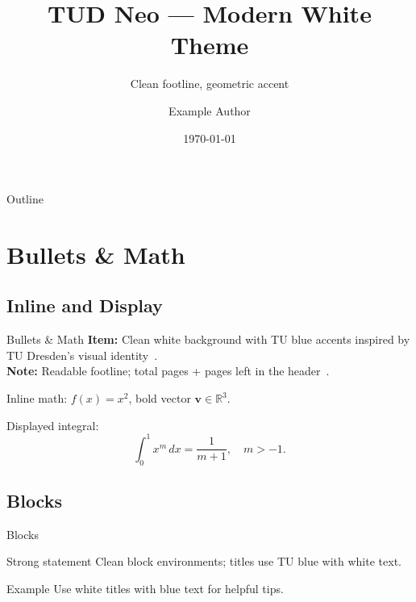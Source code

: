 \documentclass[aspectratio=169, xcolor=table]{beamer}
\title[TUD Neo Demo]{TUD Neo — Modern White Theme}
\subtitle{Clean footline, geometric accent}
\author[Example Author]{Example Author}
\institute[Faculty of Transportation and Traffic Sciences]{Faculty of Transportation and Traffic Sciences}
\date{\today}
\begin{document}
\begin{frame}[plain]
  \vspace*{1.2cm}
  \centering
  {\LARGE \inserttitle\par}
  \vspace{0.4cm}
  {\normalsize \insertsubtitle\par}
  \vspace{0.8cm}
  {\large \insertauthor\par}
  {\small \insertinstitute\par}
  \vspace{0.6cm}
  {\small \insertdate\par}
  \vspace{0.8cm}
\end{frame}

\begin{frame}{Outline}
  \tableofcontents
\end{frame}

\section{Bullets \& Math}
\subsection{Inline and Display}

\begin{frame}{Bullets \& Math}
  \textbf{Item:} Clean white background with TU blue accents inspired by TU Dresden's visual identity~\cite{dantzig1951}.\\
  \textbf{Note:} Readable footline; total pages + pages left in the header~\cite{berge1963}.

  \medskip
  Inline math: \( f(x)=x^2 \), bold vector \( \bm{v}\in\mathbb{R}^3 \).

  \medskip
  Displayed integral:
  \[
    \int_0^1 x^m\,dx = \frac{1}{m+1},\quad m> -1.
  \]
\end{frame}

\subsection{Blocks}

\begin{frame}{Blocks}
  \begin{block}{Strong statement}
    Clean block environments; titles use TU blue with white text.
  \end{block}
  \begin{exampleblock}{Example}
    Use white titles with blue text for helpful tips.
  \end{exampleblock}
\end{frame}
\end{document}
